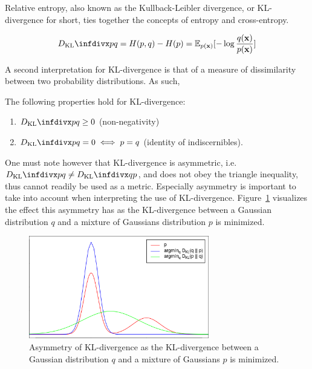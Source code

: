 Relative entropy, also known as the Kullback-Leibler divergence, or KL-divergence for short, ties together the concepts of entropy and cross-entropy. 


$$\dkl{p}{q} = H(p,q) - H(p) = \mathbb{E}_{p(\bx)}[-\log \frac{q(\bx)}{p(\bx)}]$$

A second interpretation for KL-divergence is that of a measure of dissimilarity between two probability distributions. As such, 

The following properties hold for KL-divergence:

\begin{enumerate}
\item $\dkl{p}{q} \geq 0$ (non-negativity)
\item $\dkl{p}{q} = 0 \iff p = q$ (identity of indiscernibles).
\end{enumerate}

One must note however that KL-divergence is asymmetric, i.e. $\dkl{p}{q} \neq \dkl{q}{p}$, and does not obey the triangle inequality, thus cannot readily be used as a metric. Especially asymmetry is important to take into account when interpreting the use of KL-divergence. Figure~\ref{fig:kl_divergence} visualizes the effect this asymmetry has as the KL-divergence between a Gaussian distribution $q$ and a mixture of Gaussians distribution $p$ is minimized.

\begin{figure}[!htb]
  \centering
  \includegraphics[width=0.7\textwidth]{images/kl_divergence.png}
  \caption{Asymmetry of KL-divergence as the KL-divergence between a Gaussian distribution $q$ and a mixture of Gaussians $p$ is minimized.}
  \label{fig:kl_divergence}
\end{figure}

